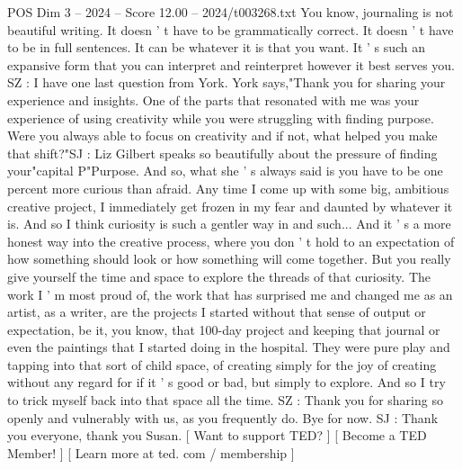 \begin{textsample}{POS Dim 3 – 2024 – Score 12.00 – 2024/t003268.txt}
You know, journaling is not beautiful writing.
It doesn ' t have to be grammatically correct.
It doesn ' t have to be in full sentences.
It can be whatever it is that you want.
It ' s such an expansive form that you can interpret and reinterpret however it best serves you.
SZ : I have one last question from York.
York says,"Thank you for sharing your experience and insights.
One of the parts that resonated with me was your experience of using creativity while you were struggling with finding purpose.
Were you always able to focus on creativity and if not, what helped you make that shift?"SJ : Liz Gilbert speaks so beautifully about the pressure of finding your"capital P"Purpose.
And so, what she ' s always said is you have to be one percent more curious than afraid.
Any time I come up with some big, ambitious creative project, I immediately get frozen in my fear and daunted by whatever it is.
And so I think curiosity is such a gentler way in and such...
And it ' s a more honest way into the creative process, where you don ' t hold to an expectation of how something should look or how something will come together.
But you really give yourself the time and space to explore the threads of that curiosity.
The work I ' m most proud of, the work that has surprised me and changed me as an artist, as a writer, are the projects I started without that sense of output or expectation, be it, you know, that 100-day project and keeping that journal or even the paintings that I started doing in the hospital.
They were pure play and tapping into that sort of child space, of creating simply for the joy of creating without any regard for if it ' s good or bad, but simply to explore.
And so I try to trick myself back into that space all the time.
SZ : Thank you for sharing so openly and vulnerably with us, as you frequently do.
Bye for now.
SJ : Thank you everyone, thank you Susan. [ Want to support TED? ] [ Become a TED Member! ] [ Learn more at ted. com / membership ]

\end{textsample}
